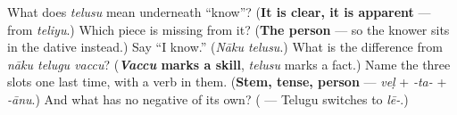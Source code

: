 \begin{tcolorbox}[breakable,colback=teal!4,colframe=teal!35!black,title={Before you move on}]
What does \emph{telusu} mean underneath \textquotedblleft{}know\textquotedblright{}? (\textbf{It is clear, it is apparent} — from \emph{teliyu}.) Which piece is missing from it? (\textbf{The person} — so the knower sits in the dative instead.) Say \textquotedblleft{}I know.\textquotedblright{} (\emph{Nāku telusu}.) What is the difference from \emph{nāku telugu vaccu}? (\textbf{\emph{Vaccu} marks a skill}, \emph{telusu} marks a fact.) Name the three slots one last time, with a verb in them. (\textbf{Stem, tense, person} — \emph{veḷ} + \emph{-ta-} + \emph{-ānu}.) And what has no negative of its own? (\textbf{} — Telugu switches to \emph{lē-}.)
\end{tcolorbox}
